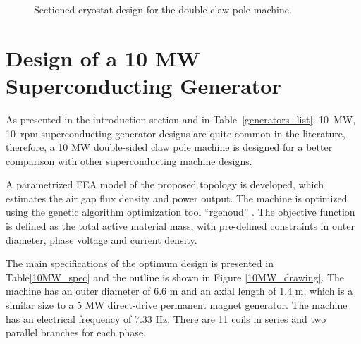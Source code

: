 \documentclass[12pt]{iopart}
\begin{document}
\begin{figure}[]
    \caption{Sectioned cryostat design for the double-claw pole machine.} 
    \label{cryostat_variants}
\end{figure}

\section{Design of a 10 MW Superconducting Generator}
 
As presented in the introduction section and in Table~\ref{generators_list}, 10~MW, 10~rpm superconducting generator designs are quite common in the literature, therefore, a 10 MW double-sided claw pole machine is designed for a better comparison with other superconducting machine designs.

A parametrized FEA model of the proposed topology is developed, which estimates the air gap flux density and power output. The machine is optimized using the genetic algorithm optimization tool ``rgenoud'' \cite{Mebane2011}. 
The objective function is defined as the total active material mass, with pre-defined constraints in outer diameter, phase voltage and current density.


The main specifications of the optimum design is presented in Table\ref{10MW_spec} and the outline is shown in Figure \ref{10MW_drawing}. The machine has an outer diameter of 6.6 m and an axial length of 1.4 m, which is a similar size to a 5 MW direct-drive permanent magnet generator. The machine has an electrical frequency of 7.33 Hz. There are 11 coils in series and two parallel branches for each phase.
\end{document}
